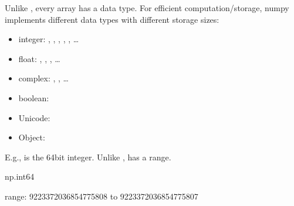\documentclass[letterpaper,10pt,english]{sphinxmanual}
\begin{document}
Unlike , every  array has a data type. For efficient computation/storage, numpy implements different data types with different storage sizes:
\begin{itemize}
\item {} 
integer: , , , , , …

\item {} 
float: , , , …

\item {} 
complex: , , …

\item {} 
boolean: 

\item {} 
Unicode: 

\item {} 
Object: 

\end{itemize}

E.g.,  is the 64\sphinxhyphen{}bit integer. Unlike ,  has a range.

\begin{sphinxVerbatim}[commandchars=\\\{\}]
np.int64
   
\end{sphinxVerbatim}

\begin{sphinxVerbatim}[commandchars=\\\{\}]
range: \PYGZhy{}9223372036854775808 to 9223372036854775807
\end{sphinxVerbatim}
\end{document}
